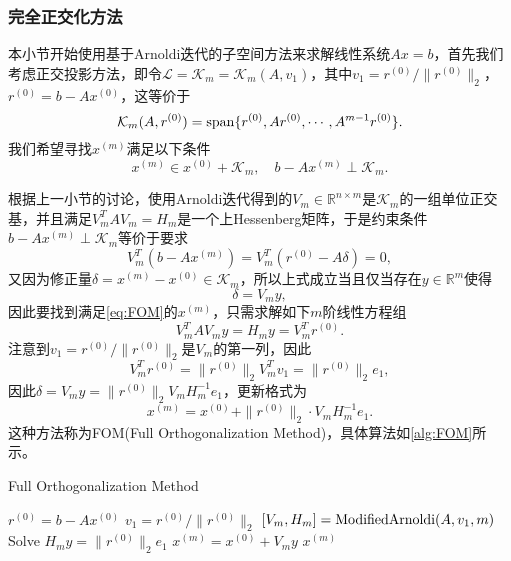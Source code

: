 \documentclass[a4paper,10pt]{ctexart}
\begin{document}
\newpage

\subsubsection{完全正交化方法}

本小节开始使用基于Arnoldi迭代的子空间方法来求解线性系统$ Ax=b $，首先我们考虑正交投影方法，即令$ \mathcal{L}=\mathcal{K}_m = \mathcal{K}_m(A,v_1) $，其中$ v_1 = r^{(0)} / \| r^{(0)} \|_2 $，$ r^{(0)} = b - Ax^{(0)} $，这等价于
\[
    \mathcal{K}_m(A,r^{(0)}) = {\rm span}\{r^{(0)},Ar^{(0)},\cdots ,A^{m-1}r^{(0)}\}.
\]
我们希望寻找$ x^{(m)} $满足以下条件
\begin{equation}\label{eq:FOM}
    x^{(m)}\in x^{(0)}+\mathcal{K}_m,\quad b - Ax^{(m)}\perp \mathcal{K}_m.
\end{equation}

根据上一小节的讨论，使用Arnoldi迭代得到的$ V_m\in \mathbb{R}^{n\times m} $是$ \mathcal{K}_m $的一组单位正交基，并且满足$ V^T_m AV_m = H_m $是一个上Hessenberg矩阵，于是约束条件$ b - Ax^{(m)}\perp \mathcal{K}_m $等价于要求
\[
    V^T_m (b - Ax^{(m)}) = V^T_m (r^{(0)} - A \delta) = 0,
\]
又因为修正量$ \delta = x^{(m)}-x^{(0)}\in \mathcal{K}_m $，所以上式成立当且仅当存在$ y\in \mathbb{R}^m $使得
\[
    \delta = V_m y,
\]
因此要找到满足\eqref{eq:FOM}的$ x^{(m)} $，只需求解如下$ m $阶线性方程组
\begin{equation}
    V^T_m A V_m y = H_m y = V^T_m r^{(0)}.
\end{equation}
注意到$ v_1= r^{(0)} / \| r^{(0)} \|_2 $是$ V_m $的第一列，因此
\[
    V^T_m r^{(0)} = \| r^{(0)} \|_2 V_m^T v_1 = \| r^{(0)} \|_2 e_1,
\]
因此$ \delta = V_m y = \| r^{(0)} \|_2V_m H_m^{-1}e_1 $，更新格式为
\begin{equation}
    x^{(m)} = x^{(0)} + \| r^{(0)} \|_2 \cdot V_m H_m^{-1}e_1 .
\end{equation}
这种方法称为FOM(Full Orthogonalization Method)，具体算法如\ref{alg:FOM}所示。

\begin{algorithm}[htbp]
    \caption{Full Orthogonalization Method}\label{alg:FOM}
    $ r^{(0)} = b - Ax^{(0)} $\;
    $ v_1 = r^{(0)} / \| r^{(0)} \|_2 $\;
    $ [V_m, H_m] = {\rm ModifiedArnoldi}(A,v_1,m) $ 
    Solve $ H_m y = \| r^{(0)} \|_2 e_1 $\;
    $ x^{(m)} = x^{(0)} + V_m y $\;
    \Return $ x^{(m)} $\;
\end{algorithm}
\end{document}
